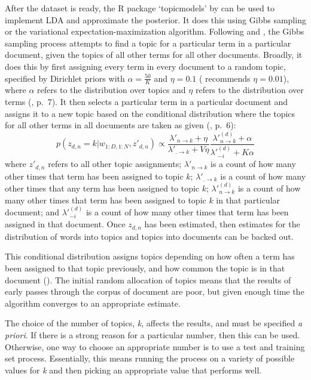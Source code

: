 \documentclass[12pt,]{article}
\theoremstyle{definition}
\theoremstyle{definition}
\theoremstyle{definition}
\theoremstyle{remark}
\begin{document}
After the dataset is ready, the R package `topicmodels' by
\citet{Grun2011} can be used to implement LDA and approximate the
posterior. It does this using Gibbs sampling or the variational
expectation-maximization algorithm. Following
\citet{SteyversGriffiths2006} and \citet{Darling2011}, the Gibbs
sampling process attempts to find a topic for a particular term in a
particular document, given the topics of all other terms for all other
documents. Broadly, it does this by first assigning every term in every
document to a random topic, specified by Dirichlet priors with
\(\alpha = \frac{50}{K}\) and \(\eta = 0.1\)
(\citet{SteyversGriffiths2006} recommends \(\eta = 0.01\)), where
\(\alpha\) refers to the distribution over topics and \(\eta\) refers to
the distribution over terms (\citet{Grun2011}, p.~7). It then selects a
particular term in a particular document and assigns it to a new topic
based on the conditional distribution where the topics for all other
terms in all documents are taken as given (\citet{Grun2011}, p.~6):
\[p(z_{d, n}=k | w_{1:D, 1:N}, z'_{d, n}) \propto \frac{\lambda'_{n\rightarrow k}+\eta}{\lambda'_{.\rightarrow k}+V\eta} \frac{\lambda'^{(d)}_{n\rightarrow k}+\alpha}{\lambda'^{(d)}_{-i}+K\alpha} \]
where \(z'_{d, n}\) refers to all other topic assignments;
\(\lambda'_{n\rightarrow k}\) is a count of how many other times that
term has been assigned to topic \(k\); \(\lambda'_{.\rightarrow k}\) is
a count of how many other times that any term has been assigned to topic
\(k\); \(\lambda'^{(d)}_{n\rightarrow k}\) is a count of how many other
times that term has been assigned to topic \(k\) in that particular
document; and \(\lambda'^{(d)}_{-i}\) is a count of how many other times
that term has been assigned in that document. Once \(z_{d,n}\) has been
estimated, then estimates for the distribution of words into topics and
topics into documents can be backed out.

This conditional distribution assigns topics depending on how often a
term has been assigned to that topic previously, and how common the
topic is in that document (\citet{SteyversGriffiths2006}). The initial
random allocation of topics means that the results of early passes
through the corpus of document are poor, but given enough time the
algorithm converges to an appropriate estimate.

The choice of the number of topics, \emph{k}, affects the results, and
must be specified \emph{a priori}. If there is a strong reason for a
particular number, then this can be used. Otherwise, one way to choose
an appropriate number is to use a test and training set process.
Essentially, this means running the process on a variety of possible
values for \emph{k} and then picking an appropriate value that performs
well.
\end{document}
